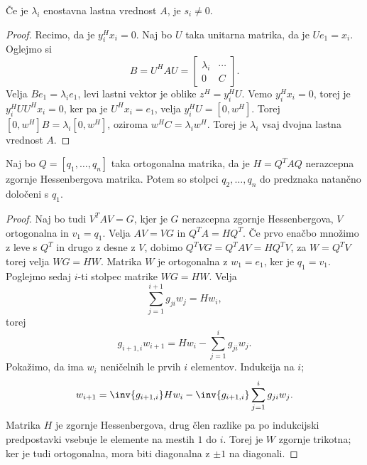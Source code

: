 \begin{izrek}
  Če je $\lambda_i$ enostavna lastna vrednost $A$, je $s_i \ne 0$.
\end{izrek}

\begin{proof}
  Recimo, da je $y_i^H x_i = 0$.
  Naj bo $U$ taka unitarna matrika, da je $U e_1 = x_i$.
  Oglejmo si
  \[
	B = U^H A U =
	\begin{bmatrix}
	  \lambda_i & \cdots \\
	  0 & C
	\end{bmatrix}.
  \]
  Velja $B e_1 = \lambda_i e_1$, levi lastni vektor je oblike $z^H = y_i^H U$.
  Vemo $y_i^H x_i = 0$, torej je $y_i^H U U^H x_i = 0$, ker pa je $U^H x_i =
  e_1$, velja $y_i^H U = [0, w^H]$.
  Torej $[0, w^H] B = \lambda_i [0, w^H]$, oziroma $w^H C = \lambda_i w^H$.
  Torej je $\lambda_i$ vsaj dvojna lastna vrednost $A$.
\end{proof}



\begin{izrek}
  Naj bo $Q = [q_1, \ldots, q_n]$ taka ortogonalna matrika, da je $H = Q^T A Q$
  nerazcepna zgornje Hessenbergova matrika.
  Potem so stolpci $q_2, \ldots, q_n$ do predznaka natančno določeni s $q_1$.
\end{izrek}

\begin{proof}
  Naj bo tudi $V^T A V = G$, kjer je $G$ nerazcepna zgornje Hessenbergova, $V$
  ortogonalna in $v_1 = q_1$.
  Velja $AV = VG$ in $Q^T A = H Q^T$.
  Če prvo enačbo množimo z leve s $Q^T$ in drugo z desne z $V$, dobimo $Q^T V G
  = Q^T A V = H Q^T V$, za $W = Q^T V$ torej velja $W G = H W$.
  Matrika $W$ je ortogonalna z $w_1 = e_1$, ker je $q_1 = v_1$.
  Poglejmo sedaj $i$-ti stolpec matrike $WG = HW$.
  Velja
  \[
	\sum_{j=1}^{i+1} g_{ji} w_j = H w_i,
  \]
  torej
  \[
	g_{i+1,i} w_{i+1} = H w_i - \sum_{j=1}^i g_{ji} w_j.
  \]
  Pokažimo, da ima $w_i$ neničelnih le prvih $i$ elementov.
  Indukcija na $i$;
  \[
	w_{i+1} = \inv{g_{i+1,i}} H w_i - \inv{g_{i+1,i}} \sum_{j=1}^i g_{ji} w_j.
  \]
  Matrika $H$ je zgornje Hessenbergova, drug člen razlike pa po indukcijski
  predpostavki vsebuje le elemente na mestih $1$ do $i$.
  Torej je $W$ zgornje trikotna; ker je tudi ortogonalna, mora biti diagonalna z
  $\pm 1$ na diagonali.
\end{proof}

